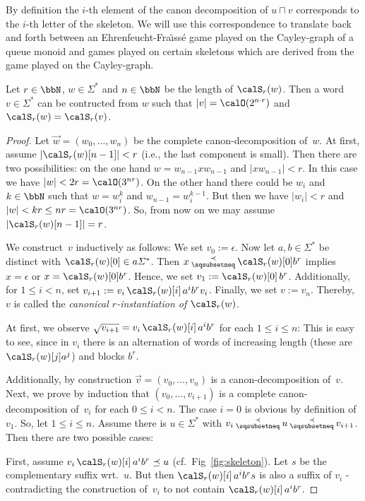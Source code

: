 By definition the $i$-th element of the canon decomposition of  $u\sqcap v$ corresponds to the $i$-th letter of the skeleton. We will use this correspondence to translate back and forth between 
an Ehrenfeucht-Fra\"{\i}ss\'{e} game played on the Cayley-graph of a queue monoid and games played on certain skeletons which are derived from the game played on the Cayley-graph. 

\begin{lemma}\label{lem:short_from_skeleton}
	Let $r\in\bbN$, $w\in\Sigma^*$ and $n\in\bbN$ be the length of $\calS_r(w)$. Then a word $v\in\varSigma^*$ can be contructed from $w$ such that $|v|=\calO(2^{n\cdot r})$ and $\calS_r(w)=\calS_r(v)$.
\end{lemma}
\begin{proof}
	Let $\vec{w}=(w_0,\dots,w_n)$ be the complete canon-decomposition of~$w$. At first, assume $|\calS_r(w)[n-1]|<r$ (i.e., the last component is small). Then there are two possibilities: on the one hand $w=w_{n-1}xw_{n-1}$ and $|xw_{n-1}|<r$. In this case we have $|w|<2r=\calO(3^{nr})$. On the other hand there could be $w_i$ and $k\in\bbN$ such that $w=w_i^k$ and $w_{n-1}=w_i^{k-1}$. But then we have $|w_i|<r$ and $|w|<kr\leq nr=\calO(3^{nr})$. So, from now on we may assume $|\calS_r(w)[n-1]|=r$.
	
	We construct~$v$ inductively as follows: We set $v_0:=\epsilon$. Now let $a,b\in\varSigma^*$ be distinct with $\calS_r(w)[0]\in a\varSigma^*$. Then $x\presuf\calS_r(w)[0]b^r$ implies $x=\epsilon$ or $x=\calS_r(w)[0]b^r$. Hence, we set $v_1:=\calS_r(w)[0]\,b^r$. Additionally, for $1\leq i<n$, set $v_{i+1}:=v_i\,\calS_r(w)[i]\,a^ib^{r}v_i$. Finally, we set $v:=v_{n}$. Thereby, $v$ is called the \emph{canonical $r$-instantiation of $\calS_r(w)$}.
	
	At first, we observe $\root{v_{i+1}}=v_i\,\calS_r(w)[i]\,a^ib^{r}$ for each $1\leq i\leq n$: This is easy to see, since in $v_i$ there is an alternation of words of increasing length (these are $\calS_r(w)[j]a^j$) and blocks $b^r$.
	
	Additionally, by construction $\vec{v}=(v_0,\dots,v_{n})$ is a canon-decomposition of~$v$. Next, we prove by induction that $(v_0,\dots,v_{i+1})$ is a complete canon-decomposition of~$v_i$ for each $0\leq i<n$. The case $i=0$ is obvious by definition of~$v_1$. So, let $1\leq i\leq n$. Assume there is $u\in\varSigma^*$ with $v_i\presuf u\presuf v_{i+1}$. Then there are two possible cases:
	
	First, assume $v_i\,\calS_r(w)[i]\,a^ib^{r}\preceq u$ (cf.\ Fig~\ref{fig:skeleton}). Let $s$ be the complementary suffix wrt.~$u$. But then $\calS_r(w)[i]\,a^ib^{r}s$ is also a suffix of $v_i$ - contradicting the construction of~$v_i$ to not contain $\calS_r(w)[i]\,a^ib^r$.
	

\end{proof}
